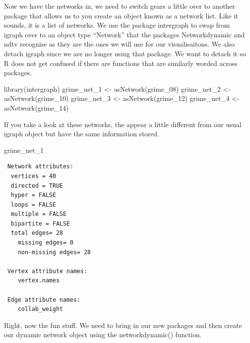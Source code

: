 \documentclass[
  letterpaper,
  DIV=11,
  numbers=noendperiod]{scrreprt}
\newenvironment{Shaded}{\begin{snugshade}}{\end{snugshade}}
\newcommand{\FunctionTok}[1]{\textcolor[rgb]{0.28,0.35,0.67}{#1}}
\newcommand{\NormalTok}[1]{\textcolor[rgb]{0.00,0.23,0.31}{#1}}
\newcommand{\OtherTok}[1]{\textcolor[rgb]{0.00,0.23,0.31}{#1}}
\begin{document}
Now we have the networks in, we need to switch gears a little over to
another package that allows us to you create an object known as a
network list. Like it sounds, it is a list of networks. We use the
package intergraph to swap from igraph over to an object type
``Network'' that the packages Networkdynamic and ndtv recognise as they
are the ones we will use for our visualisaitons. We also detach igraph
since we are no longer using that package. We want to detach it so R
does not get confused if there are functions that are similarly worded
across packages.

\begin{Shaded}
\begin{Highlighting}[]
\FunctionTok{library}\NormalTok{(intergraph)}
\NormalTok{grime\_net\_1 }\OtherTok{\textless{}{-}} \FunctionTok{asNetwork}\NormalTok{(grime\_08)}
\NormalTok{grime\_net\_2 }\OtherTok{\textless{}{-}} \FunctionTok{asNetwork}\NormalTok{(grime\_10)}
\NormalTok{grime\_net\_3 }\OtherTok{\textless{}{-}} \FunctionTok{asNetwork}\NormalTok{(grime\_12)}
\NormalTok{grime\_net\_4 }\OtherTok{\textless{}{-}} \FunctionTok{asNetwork}\NormalTok{(grime\_14)}
\end{Highlighting}
\end{Shaded}

If you take a look at these networks, the appear a little different from
our usual igraph object but have the same information stored.

\begin{Shaded}
\begin{Highlighting}[]
\NormalTok{grime\_net\_1}
\end{Highlighting}
\end{Shaded}

\begin{verbatim}
 Network attributes:
  vertices = 40 
  directed = TRUE 
  hyper = FALSE 
  loops = FALSE 
  multiple = FALSE 
  bipartite = FALSE 
  total edges= 28 
    missing edges= 0 
    non-missing edges= 28 

 Vertex attribute names: 
    vertex.names 

 Edge attribute names: 
    collab_weight 
\end{verbatim}

Right, now the fun stuff. We need to bring in our new packages and then
create our dynamic network object using the networkdynamic() function.
\end{document}

